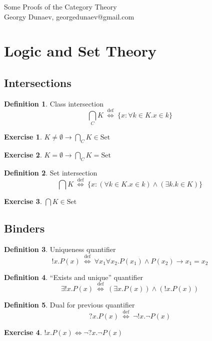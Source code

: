 \documentclass[10pt,a4paper]{article}
\theoremstyle{definition}
\newtheorem{definition}{Definition}[section]
\newtheorem{exercise}{Exercise}[section]
\newcommand{\LRA}{\Longleftrightarrow}
\newcommand{\defi}{{\mbox{def}}}
\newcommand{\propdef}{{\stackrel{\defi}{\ \Longleftrightarrow\ }}}
\newcommand{\inter}{{\bigcap}}
\newcommand{\interclass}{{{\bigcap}_C}}
\newcommand{\Set}{{\mbox{Set}}}
\begin{document}
Some Proofs of the Category Theory\\
Georgy Dunaev, georgedunaev@gmail.com\\
\section{Logic and Set Theory}
\subsection{Intersections}
\begin{definition} Class intersection
$$\interclass K \propdef \{x: \forall k\in K. x\in k\}$$
\end{definition}

\begin{exercise}
$K\neq \emptyset \to \interclass K \in \Set$
\end{exercise}

\begin{exercise}
$K=\emptyset \to \interclass K = \Set$
\end{exercise}

\begin{definition} Set intersection
$$\inter K \propdef \{x: (\forall k\in K. x\in k)\land (\exists k.k\in K)\}$$
\end{definition}

\begin{exercise}
$\inter K \in \Set$
\end{exercise}
\subsection{Binders}
\begin{definition} Uniqueness quantifier
$$!x. P(x) \propdef \forall x_1 \forall x_2. P(x_1)\land P(x_2)\to x_1=x_2$$
\end{definition}

\begin{definition} ``Exists and unique'' quantifier
$$\exists !x. P(x) \propdef (\exists x. P(x))\land(!x. P(x))$$
\end{definition}

\begin{definition}  Dual for previous quantifier 
$$?x. P(x) \propdef \neg !x. \neg P(x)$$
\end{definition}

\begin{exercise}
$!x. P(x) \LRA \neg ?x. \neg P(x)$
\end{exercise}
\end{document}
